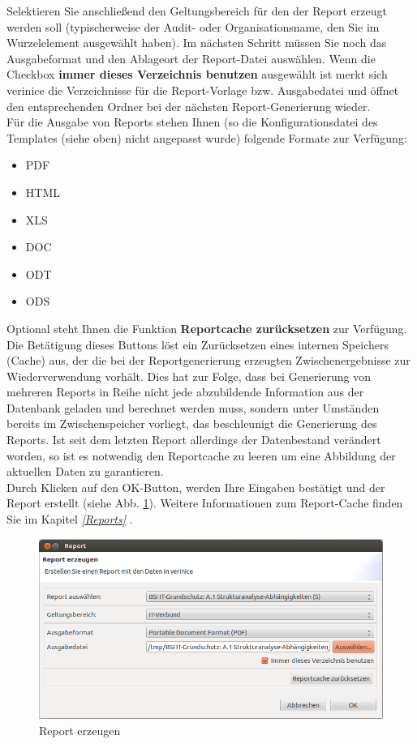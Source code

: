 \documentclass[a4paper,10pt]{book}
\begin{document}
Selektieren Sie anschließend den Geltungsbereich für den der Report erzeugt werden soll
(typischerweise der Audit- oder Organisationsname, den Sie im Wurzelelement ausgewählt haben). Im nächsten Schritt müssen Sie noch das Ausgabeformat
und den Ablageort der Report-Datei auswählen. Wenn die Checkbox \textbf{immer dieses Verzeichnis benutzen} ausgewählt ist merkt sich verinice die Verzeichnisse für die Report-Vorlage bzw. Ausgabedatei und öffnet den entsprechenden Ordner bei der nächsten Report-Generierung wieder.
\newline\\
Für die Ausgabe von Reports stehen Ihnen (so die Konfigurationsdatei des Templates (siehe oben) nicht angepasst wurde) folgende Formate zur Verfügung:
\begin{itemize}
 \item \textsc{PDF}
 \item \textsc{HTML}
 \item \textsc{XLS}
 \item \textsc{DOC}
 \item \textsc{ODT}
 \item \textsc{ODS}
\end{itemize}
Optional steht Ihnen die Funktion \textbf{Reportcache zurücksetzen} zur
Verfügung. Die Betätigung dieses Buttons löst ein Zurücksetzen eines
internen Speichers (Cache) aus,
der die bei der Reportgenerierung erzeugten Zwischenergebnisse zur
Wiederverwendung vorhält. Dies hat zur Folge, dass bei Generierung von
mehreren Reports in Reihe nicht jede abzubildende Information aus der Datenbank geladen und
berechnet werden muss, sondern unter Umständen bereits im
Zwischenspeicher vorliegt, das beschleunigt die Generierung des Reports. Ist seit
dem letzten Report allerdings der Datenbestand verändert worden, so ist
es notwendig den Reportcache zu leeren um eine Abbildung der aktuellen
Daten zu garantieren.
\newline\\
Durch Klicken auf den OK-Button, werden Ihre Eingaben bestätigt und der Report erstellt (siehe Abb. \ref{Report erzeugen}).
\newline
Weitere Informationen zum Report-Cache finden Sie im Kapitel {\em \ref{Reports} }.
\begin{figure}[htb!]
  \centering
  \includegraphics[scale=.45]{Screenshot/Reportdialog.png}
  \caption{\label{Report erzeugen} Report erzeugen}
\end{figure}
\end{document}
